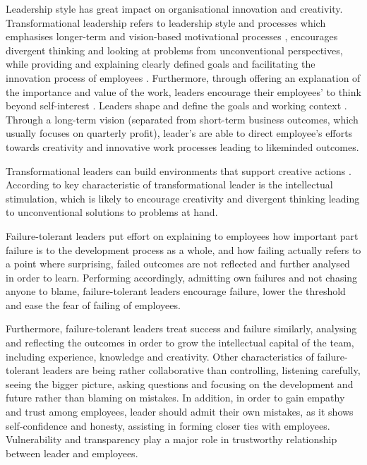 Leadership style has great impact on organisational innovation and creativity. Transformational leadership refers to leadership style and processes which emphasises longer-term and vision-based motivational processes \citep{bass1997full}, encourages divergent thinking and looking at problems from unconventional perspectives, while providing and explaining clearly defined goals and facilitating the innovation process of employees \citep{bass1990implications}. Furthermore, through offering an explanation of the importance and value of the work, leaders encourage their employees' to think beyond self-interest \citep{yukl2002leadership}. Leaders shape and define the goals and working context \citep{amabile1998kill, redmond1993putting}. Through a long-term vision (separated from short-term business outcomes, which usually focuses on quarterly profit), leader's are able to direct employee's efforts towards creativity and innovative work processes leading to likeminded outcomes\citep{amabile1996assessing}. 

Transformational leaders can build environments that support creative actions \citep{sosik1998transformational,avolio1988transformational}. According to \citet{sosik1998transformational} key characteristic of transformational leader is the intellectual stimulation, which is likely to encourage creativity and divergent thinking leading to unconventional solutions to problems at hand. 

Failure-tolerant leaders put effort on explaining to employees how important part failure is to the development process as a whole, and how failing actually refers to a point where surprising, failed outcomes are not reflected and further analysed in order to learn. Performing accordingly, admitting own failures and not chasing anyone to blame, failure-tolerant leaders encourage failure, lower the threshold and ease the fear of failing of employees. \citep{farson2002failuretolerantleader}

Furthermore, failure-tolerant leaders treat success and failure similarly, analysing and reflecting the outcomes in order to grow the intellectual capital of the team, including experience, knowledge and creativity. Other characteristics of failure-tolerant leaders are being rather collaborative than controlling, listening carefully, seeing the bigger picture, asking questions and focusing on the development and future rather than blaming on mistakes. In addition, in order to gain empathy and trust among employees, leader should admit their own mistakes, as it shows self-confidence and honesty, assisting in forming closer ties with employees. Vulnerability and transparency play a major role in trustworthy relationship between leader and employees.  \citep{farson2002failuretolerantleader}


